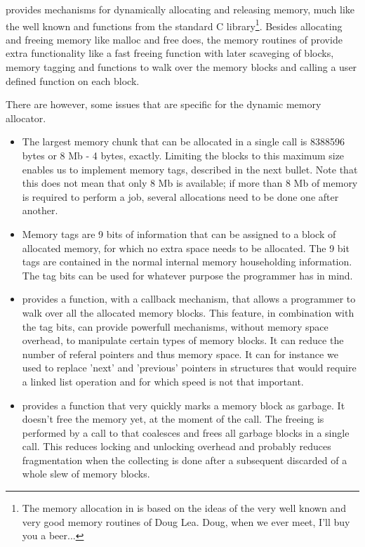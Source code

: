\oswald provides mechanisms for dynamically allocating and releasing memory,
much like the well known  and  functions from
the standard C library\footnote{The memory allocation in \oswald is based on
the ideas of the very well known and very good memory routines of Doug Lea.
Doug, when we ever meet, I'll buy you a beer...}.
Besides allocating and freeing memory like malloc and free does, the memory
routines of \oswald provide extra functionality like a fast freeing function
with later scaveging of blocks, memory tagging and functions to walk over
the memory blocks and calling a user defined function on each block.

There are however, some issues that are specific for the \oswald dynamic
memory allocator.

\begin{itemize}
\item The largest memory chunk that can be allocated in a single call is
8388596 bytes or 8 Mb - 4 bytes, exactly. Limiting the blocks to this maximum size enables us
to implement memory tags, described in the next bullet. Note that this does
not mean that only 8 Mb is available; if more than 8 Mb of memory is
required to perform a job, several allocations need to be done one after
another. 
\item Memory tags are 9 bits of information that can be assigned to a block
of allocated memory, for which no extra space needs to be allocated. The 9
bit tags are contained in the normal internal memory householding
information. The tag bits can be used for whatever purpose the programmer
has in mind. 
\item \oswald provides a function, with a callback mechanism, that allows a
programmer to walk over all the allocated memory blocks. This feature, in
combination with the tag bits, can provide powerfull mechanisms, without
memory space overhead, to manipulate certain types of memory blocks. It can
reduce the number of referal pointers and thus memory space. It can for
instance we used to replace 'next' and 'previous' pointers in structures
that would require a linked list operation and for which speed is not that
important.
\item \oswald provides a  function that very quickly marks a
memory block as garbage. It doesn't free the memory yet, at the moment of
the call. The freeing is performed by a call to 
that coalesces and frees all garbage blocks in a single call. This reduces
locking and unlocking overhead and probably reduces fragmentation when the
collecting is done after a subsequent discarded of a whole slew of memory
blocks.
\end{itemize}

